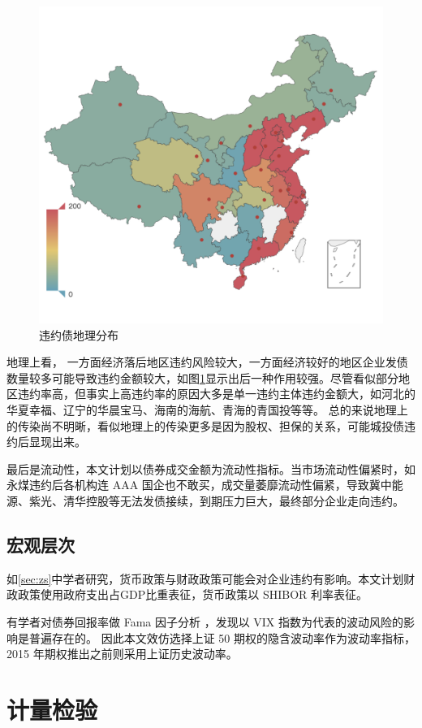 \begin{figure}[htbp]
	\centering
	\includegraphics[width=.9\linewidth]{./data/default_by_geo.png}
	\caption{\label{fig:geo}违约债地理分布}
\end{figure}
地理上看，
一方面经济落后地区违约风险较大，一方面经济较好的地区企业发债数量较多可能导致违约金额较大，如图\ref{fig:geo}显示出后一种作用较强。尽管看似部分地区违约率高，但事实上高违约率的原因大多是单一违约主体违约金额大，如河北的华夏幸福、辽宁的华晨宝马、海南的海航、青海的青国投等等。
总的来说地理上的传染尚不明晰，看似地理上的传染更多是因为股权、担保的关系，可能城投债违约后显现出来。

最后是流动性，本文计划以债券成交金额为流动性指标。当市场流动性偏紧时，如永煤违约后各机构连 AAA 国企也不敢买，成交量萎靡流动性偏紧，导致冀中能源、紫光、清华控股等无法发债接续，到期压力巨大，最终部分企业走向违约。
\subsection{宏观层次}
如\ref{sec:zs}中学者研究，货币政策与财政政策可能会对企业违约有影响。本文计划财政政策使用政府支出占GDP比重表征，货币政策以 SHIBOR 利率表征。

有学者对债券回报率做 Fama 因子分析
\autocite{chung2019volatility}
，发现以 VIX 指数为代表的波动风险的影响是普遍存在的。
因此本文效仿选择上证 50 期权的隐含波动率作为波动率指标，2015 年期权推出之前则采用上证历史波动率。

\section{计量检验}
